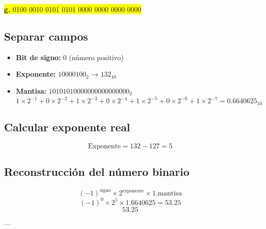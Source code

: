 \documentclass[a4paper,12pt]{article}
\begin{document}
	\begin{center}
		\colorbox{yellow}{\textbf{g.} 0100 0010 0101 0101 0000 0000 0000 0000}
		
		\subsection*{Separar campos}
		
		\begin{itemize}
			\item \textbf{Bit de signo:} 0 (número positivo)
			\item \textbf{Exponente:} $10000100_2$ → $132_{10}$
			\item \textbf{Mantisa:} $10101010000000000000000_2$ 
			\[
			1\times2^{-1} + 0\times2^{-2} + 1\times2^{-3} + 0\times2^{-4} + 1\times2^{-5} + 0\times2^{-6} + 1\times2^{-7} = 0.6640625_{10}
			\]
		\end{itemize}
		
		\subsection*{Calcular exponente real}
		
		\[
		\text{Exponente} = 132 - 127 = 5
		\]
		
		
		
		\subsection*{Reconstrucción del número binario}	
		\[
		(-1)^{\text{signo}} \times 2^{\text{exponente}} \times 1.\text{mantisa}
		\]
		\[
		(-1)^0 \times 2^5 \times 1.6640625 = 53.25
		\]
		\vspace{1em}
		\[
		\boxed{53.25}
		\]
		
		---
	\end{center}
\end{document}
